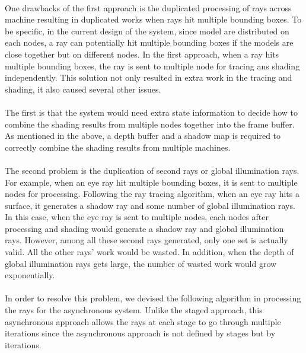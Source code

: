 \documentclass[a4paper, oneside, 10pt]{article}
\begin{document}
\paragraph{} One drawbacks of the first approach is the duplicated processing of rays across machine resulting in duplicated works when rays hit multiple bounding boxes. To be specific, in the current design of the system, since model are distributed on each nodes, a ray can potentially hit multiple bounding boxes if the models are close together but on different nodes.  In the first approach, when a ray hits multiple bounding boxes, the ray is sent to multiple node for tracing ans shading independently. This solution not only resulted in extra work in the tracing and shading, it also caused several other issues.
\paragraph{} The first is that the system would need extra state information to decide how to combine the shading results from multiple nodes together into the frame buffer. As mentioned in the above, a depth buffer and a shadow map is required to correctly combine the shading results from multiple machines. 
\paragraph{} The second problem is the duplication of second rays or global illumination rays. For example, when an eye ray hit multiple bounding boxes, it is sent to multiple nodes for processing. Following the ray tracing algorithm, when an eye ray hits a surface, it generates a shadow ray and some number of global illumination rays. In this case, when the eye ray is sent to multiple nodes, each nodes after processing and shading would generate a shadow ray and global illumination rays. However, among all these second rays generated, only one set is actually valid. All the other rays' work would be wasted. In addition, when the depth of global illumination rays gets large, the number of wasted work would grow exponentially. 
\paragraph{} In order to resolve this problem, we devised the following algorithm in processing the rays for the asynchronous system.  Unlike the staged approach, this asynchronous approach allows the rays at each stage to go through multiple iterations since the asynchronous approach is not defined by stages but by iterations.
\end{document}

